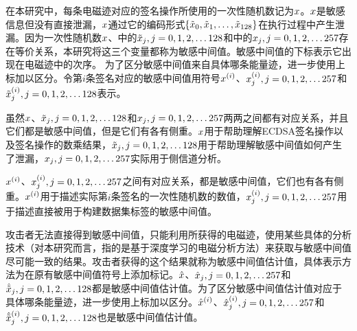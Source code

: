 {{%
}	
	在本研究中，每条电磁迹对应的签名操作所使用的一次性随机数记为$x$。$x$是敏感信息但没有直接泄漏，$x$通过它的编码形式$\left\{\tilde{x}_0,\tilde{x}_1,\dots,\tilde{x}_{128}\right\}$在执行过程中产生泄漏。因为一次性随机数$x$、中的$\tilde{x}_j,j=0,1,2,\dots128$和中的$x_j,j=0,1,2,\dots257$存在等价关系，本研究将这三个变量都称为敏感中间值。敏感中间值的下标表示它出现在电磁迹中的次序。
	为了区分敏感中间值来自具体哪条能量迹，进一步使用上标加以区分。令第$i$条签名对应的敏感中间值用符号$x^{(i)}$、$x^{(i)}_j,j=0,1,2,\dots257$和$\tilde{x}^{(i)}_j,j=0,1,2,\dots128$表示。
	
	虽然$x$、$\tilde{x}_j,j=0,1,2,\dots128$和$x_j,j=0,1,2,\dots257$两两之间都有对应关系，并且它们都是敏感中间值，但是它们有各有侧重。$x$用于帮助理解ECDSA签名操作以及签名操作的数乘结果，$\tilde{x}_j,j=0,1,2,\dots128$用于帮助理解敏感中间值如何产生了泄漏，$x_j,j=0,1,2,\dots257$实际用于侧信道分析。
	
	$x^{(i)}$、$x^{(i)}_j,j=0,1,2,\dots257$之间有对应关系，都是敏感中间值，它们也有各有侧重。$x^{(i)}$用于描述实际第$i$条签名的一次性随机数的数值，$x^{(i)}_j,j=0,1,2,\dots257$用于描述直接被用于构建数据集标签的敏感中间值。

	攻击者无法直接得到敏感中间值，只能利用所获得的电磁迹，使用某些具体的分析技术（对本研究而言，指的是基于深度学习的电磁分析方法）来获取与敏感中间值尽可能一致的结果。攻击者获得的这个结果就称为敏感中间值估计值，具体表示方法为在原有敏感中间值符号上添加$\hat{}$标记。$\hat{x}$、$\hat{x}_j,j=0,1,2,\dots257$和$\hat{\tilde{x}}_j,j=0,1,2,\dots128$都是敏感中间值估计值。为了区分敏感中间值估计值对应于具体哪条能量迹，进一步使用上标加以区分。$\hat{x}^{(i)}$、$\hat{x}^{(i)}_j,j=0,1,2,\dots257$和$\hat{\tilde{x}}^{(i)}_j,j=0,1,2,\dots128$也是敏感中间值估计值。
	
	
}
